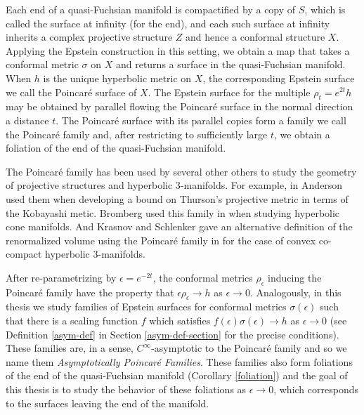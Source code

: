 \documentclass{amsart}
\begin{document}
Each end of a quasi-Fuchsian manifold is compactified by a copy of $S$, which is called the surface at infinity (for the end), and each such surface at infinity inherits a complex projective structure $Z$ and hence a conformal structure $X$. 
Applying the Epstein construction in this setting, we obtain a map that takes a conformal metric $\sigma$ on $X$ and returns a surface in the quasi-Fuchsian manifold.
When $h$ is the unique hyperbolic metric on $X$, the corresponding Epstein surface we call the Poincar\'e surface of $X$. 
The Epstein surface for the multiple $\rho_t = e^{2t}h$ may be obtained by parallel flowing the Poincar\'e surface in the normal direction a distance $t$. 
The Poincar\'e surface with its parallel copies form a family we call the Poincar\'e family and, after restricting to sufficiently large $t$, we obtain a foliation of the end of the quasi-Fuchsian manifold. 

The Poincar\'e family has been used by several other others to study the geometry of projective structures and hyperbolic 3-manifolds. 
For example, in \cite{anderson1998} Anderson used them when developing a bound on Thurson's projective metric in terms of the Kobayashi metic. 
Bromberg used this family in \cite{bromberg2004} when studying hyperbolic cone manifolds. 
And Krasnov and Schlenker gave an alternative definition of the renormalized volume using the Poincar\'e family in \cite{krasnov-schlenker2008} for the case of convex co-compact hyperbolic 3-manifolds. 

After re-parametrizing by $\epsilon = e^{-2t}$, the conformal metrics $\rho_\epsilon$ inducing the Poincar\'e family have the property that $\epsilon \rho_\epsilon \to h$ as $\epsilon \to 0$. 
Analogously, in this thesis we study families of Epstein surfaces for conformal metrics $\sigma(\epsilon)$ such that there is a scaling function $f$ which satisfies $f(\epsilon)\sigma(\epsilon) \to h$ as $\epsilon \to 0$ (see Definition \ref{asym-def} in Section \ref{asym-def-section} for the precise conditions). 
These families are, in a sense, $C^\infty$-asymptotic to the Poincar\'e family and so we name them \emph{Asymptotically Poincar\'e Families}. 
These families also form foliations of the end of the quasi-Fuchsian manifold  (Corollary \ref{foliation}) and the goal of this thesis is to study the behavior of these foliations as $ \epsilon \to 0$, which corresponds to the surfaces leaving the end of the manifold. 
\end{document}
